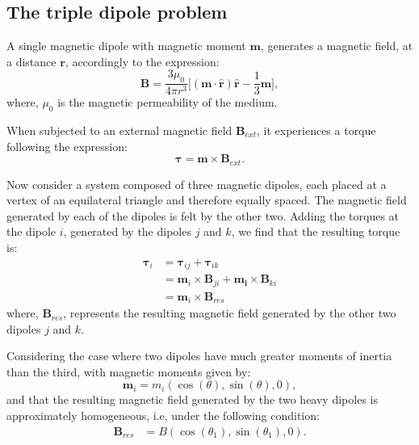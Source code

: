 
\subsection{The triple dipole problem}
A single magnetic dipole with magnetic moment $\boldsymbol{m}$, generates a magnetic field, at a distance $\boldsymbol{r}$, accordingly to the expression: 
\begin{equation}
    \boldsymbol{B} = \dfrac{3\mu_0}{4 \pi r^3}\bigg[ (\boldsymbol{m \cdot \hat{r}})\boldsymbol{\hat{r}} - \dfrac{1}{3}\boldsymbol{m} \bigg],
    \label{eq:MagneticFieldDipole}
\end{equation}
where, $\mu_0$ is the magnetic permeability of the medium. 

When subjected to an external magnetic field $\boldsymbol{B}_{ext}$, it experiences a torque following the expression: 
\begin{equation}
    \boldsymbol{\tau} = \boldsymbol{m} \times \boldsymbol{B}_{ext}.
    \label{eq:NewtonSecondLaw}
\end{equation}

Now consider a system composed of three magnetic dipoles, each placed at a vertex of an equilateral triangle and therefore equally spaced. The magnetic field generated by each of the dipoles is felt by the other two. Adding the torques at the dipole $i$, generated by the dipoles $j$ and $k$, we find that the resulting torque is:
\begin{equation}
    \begin{aligned}
        \boldsymbol{\tau}_i &= \boldsymbol{\tau}_{ij} + \boldsymbol{\tau}_{ik}\\
            & =  \boldsymbol{m}_i \times \boldsymbol{B}_{j i}+\boldsymbol{m_i} \times \boldsymbol{B}_{k i}\\
            &= \boldsymbol{m}_i \times \boldsymbol{B}_{res}
    \end{aligned}
    \label{eq:Torques}
\end{equation}
where, $\boldsymbol{B}_{res}$, represents the resulting magnetic field generated by the other two dipoles $j$ and $k$. 

Considering the case where two dipoles have much greater moments of inertia than the third, with magnetic moments given by:
\begin{equation}
    \boldsymbol{m}_i = m_i (\cos(\theta), \sin(\theta), 0),
    \label{eq:MagneticMoment}
\end{equation}
and that the resulting magnetic field generated by the two heavy dipoles is approximately homogeneous, i.e, under the following condition:
\begin{equation}
    \begin{aligned}
        \boldsymbol{B}_{res} &= B(\cos(\theta_1),\sin(\theta_1), 0).
    \end{aligned}
    \label{eq:Hipotesys}
\end{equation}

